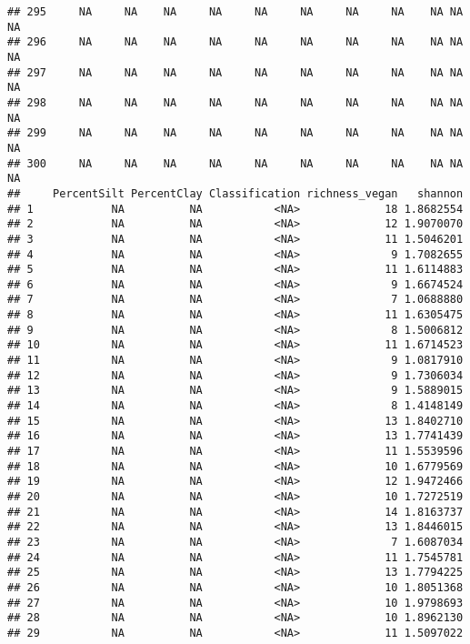 \documentclass[]{article}
\begin{document}
\begin{verbatim}
## 295     NA     NA    NA     NA     NA     NA     NA     NA    NA NA          NA
## 296     NA     NA    NA     NA     NA     NA     NA     NA    NA NA          NA
## 297     NA     NA    NA     NA     NA     NA     NA     NA    NA NA          NA
## 298     NA     NA    NA     NA     NA     NA     NA     NA    NA NA          NA
## 299     NA     NA    NA     NA     NA     NA     NA     NA    NA NA          NA
## 300     NA     NA    NA     NA     NA     NA     NA     NA    NA NA          NA
##     PercentSilt PercentClay Classification richness_vegan   shannon
## 1            NA          NA           <NA>             18 1.8682554
## 2            NA          NA           <NA>             12 1.9070070
## 3            NA          NA           <NA>             11 1.5046201
## 4            NA          NA           <NA>              9 1.7082655
## 5            NA          NA           <NA>             11 1.6114883
## 6            NA          NA           <NA>              9 1.6674524
## 7            NA          NA           <NA>              7 1.0688880
## 8            NA          NA           <NA>             11 1.6305475
## 9            NA          NA           <NA>              8 1.5006812
## 10           NA          NA           <NA>             11 1.6714523
## 11           NA          NA           <NA>              9 1.0817910
## 12           NA          NA           <NA>              9 1.7306034
## 13           NA          NA           <NA>              9 1.5889015
## 14           NA          NA           <NA>              8 1.4148149
## 15           NA          NA           <NA>             13 1.8402710
## 16           NA          NA           <NA>             13 1.7741439
## 17           NA          NA           <NA>             11 1.5539596
## 18           NA          NA           <NA>             10 1.6779569
## 19           NA          NA           <NA>             12 1.9472466
## 20           NA          NA           <NA>             10 1.7272519
## 21           NA          NA           <NA>             14 1.8163737
## 22           NA          NA           <NA>             13 1.8446015
## 23           NA          NA           <NA>              7 1.6087034
## 24           NA          NA           <NA>             11 1.7545781
## 25           NA          NA           <NA>             13 1.7794225
## 26           NA          NA           <NA>             10 1.8051368
## 27           NA          NA           <NA>             10 1.9798693
## 28           NA          NA           <NA>             10 1.8962130
## 29           NA          NA           <NA>             11 1.5097022

\end{verbatim}
\end{document}
